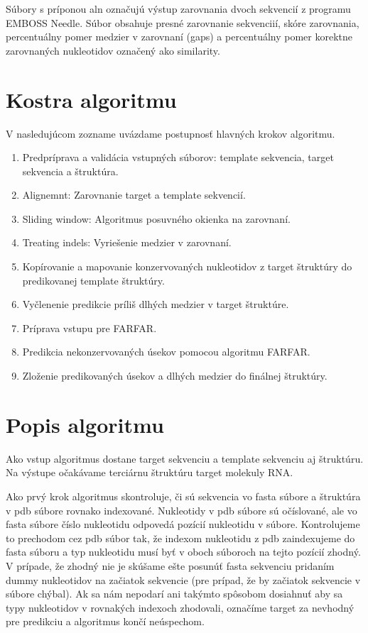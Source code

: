 \indent Súbory s príponou aln označujú výstup zarovnania dvoch sekvencií z programu EMBOSS Needle. Súbor obsahuje presné zarovnanie sekvenciií, skóre zarovnania, percentuálny pomer medzier v zarovnaní (gaps) a percentuálny pomer korektne zarovnaných nukleotidov označený ako similarity. 


\section{Kostra algoritmu}

V nasledujúcom zozname uvázdame postupnosť hlavných krokov algoritmu.\label{3-kostra}
\begin{enumerate}
\item Predpríprava a validácia vstupných súborov: template sekvencia, target sekvencia a štruktúra.
\item Alignemnt: Zarovnanie target a template sekvencií.
\item Sliding window: Algoritmus posuvného okienka na zarovnaní.
\item Treating indels: Vyriešenie medzier v zarovnaní. \label{3-indels}
\item Kopírovanie a mapovanie konzervovaných nukleotidov z target štruktúry do predikovanej template štruktúry. \label{3-map}
\item Vyčlenenie predikcie príliš dlhých medzier v target štruktúre.
\item Príprava vstupu pre FARFAR.
\item Predikcia nekonzervovaných úsekov pomocou algoritmu FARFAR.
\item Zloženie predikovaných úsekov a dlhých medzier do finálnej štruktúry.
\end{enumerate}

\section{Popis algoritmu}
Ako vstup algoritmus dostane target sekvenciu a template sekvenciu aj štruktúru. Na výstupe očakávame terciárnu štruktúru target molekuly RNA.


\indent  Ako prvý krok algoritmus skontroluje, či sú sekvencia vo fasta súbore a štruktúra v pdb súbore rovnako indexované. Nukleotidy v pdb súbore sú očíslované, ale vo fasta súbore číslo nukleotidu odpovedá pozícií nukleotidu v súbore. Kontrolujeme to prechodom cez pdb súbor tak, že indexom nukleotidu z pdb zaindexujeme do fasta súboru a typ nukleotidu musí byť v oboch súboroch na tejto pozícií zhodný. V prípade, že zhodný nie je skúšame ešte posunúť fasta sekvenciu pridaním dummy nukleotidov na začiatok sekvencie (pre prípad, že by začiatok sekvencie v súbore chýbal). Ak sa nám nepodarí ani takýmto spôsobom dosiahnuť aby sa typy nukleotidov v rovnakých indexoch zhodovali, označíme target za nevhodný pre predikciu a algoritmus končí neúspechom.


